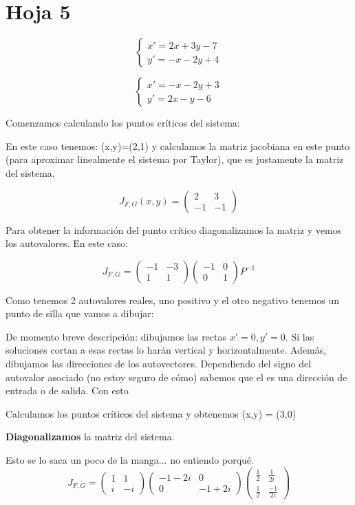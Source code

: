 \documentclass[nochap]{apuntes}
\begin{document}
\section{Hoja 5}
\begin{problem}[1]
\ppart 
\[\left\{ \begin{array}{c}
x'=2x+3y-7\\y'=-x-2y+4
\end{array}\right.\]

\ppart \[\left\{
\begin{array}{c}
x'=-x-2y+3\\y'=2x-y-6
\end{array}\right.\]

\solution
\spart
Comenzamos calculando los puntos críticos del sistema:

En este caso tenemos: (x,y)=(2,1) y calculamos la matriz jacobiana en este punto (para aproximar linealmente el sistema por Taylor), que es justamente la matriz del sistema.

\[J_{F,G} (x,y) = \begin{pmatrix}
2&3\\-1&-1
\end{pmatrix}\]

Para obtener la información del punto crítico diagonalizamos la matriz y vemos los autovalores. En este caso:

\[J_{F,G} = \begin{pmatrix}
-1&-3\\1&1
\end{pmatrix}\begin{pmatrix}
-1 &0\\0&1
\end{pmatrix}P^{-1}\]

Como tenemos 2 autovalores reales, uno positivo y el otro negativo tenemos un punto de silla que vamos a dibujar: 

De momento breve descripción: dibujamos las rectas $x'=0,y'=0$. Si las soluciones cortan a esas rectas lo harán vertical y horizontalmente. Además, dibujamos las direcciones de los autovectores. Dependiendo del signo del autovalor asociado (no estoy seguro de cómo) sabemos que el es una dirección de entrada o de salida. Con esto 

\spart
Calculamos los puntos críticos del sistema y obtenemos (x,y) = (3,0)

\textbf{Diagonalizamos} la matriz del sistema.

Esto se lo saca un poco de la manga... no entiendo porqué.
\[J_{F,G} = \begin{pmatrix}
1&1\\i&-i
\end{pmatrix}
\begin{pmatrix}
-1-2i&0\\0&-1+2i
\end{pmatrix}\begin{pmatrix}
\frac{1}{2}&\frac{1}{2i}\\
\frac{1}{2}&\frac{-1}{2i}
\end{pmatrix}
\]


\end{problem}
\end{document}
